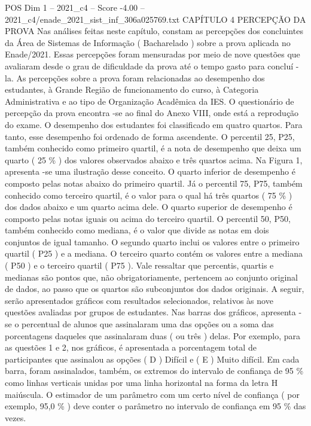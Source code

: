 \begin{textsample}{POS Dim 1 – 2021\_c4 – Score -4.00 – 2021\_c4/enade\_2021\_sist\_inf\_306a025769.txt}  \label{ex:f1_pos_372}
CAPÍTULO 4 PERCEPÇÃO DA PROVA Nas análises feitas neste capítulo, constam as percepções dos concluintes da Área de Sistemas de Informação ( Bacharelado ) sobre a prova aplicada no Enade/2021.
Essas percepções foram mensuradas por meio de nove questões que avaliaram desde o grau de dificuldade da prova até o tempo gasto para concluí -la.
As percepções sobre a prova foram relacionadas ao desempenho dos estudantes, à Grande Região de funcionamento do curso, à Categoria Administrativa e ao tipo de Organização Acadêmica da IES.
O questionário de percepção da prova encontra -se ao final do Anexo VIII, onde está a reprodução do exame.
O desempenho dos estudantes foi classificado em quatro quartos.
Para tanto, esse desempenho foi ordenado de forma ascendente.
O percentil 25, P25, também conhecido como primeiro quartil, é a nota de desempenho que deixa um quarto ( 25 \% ) dos valores observados abaixo e três quartos acima.
Na Figura 1, apresenta -se uma ilustração desse conceito.
O quarto inferior de desempenho é composto pelas notas abaixo do primeiro quartil.
Já o percentil 75, P75, também conhecido como terceiro quartil, é o valor para o qual há três quartos ( 75 \% ) dos dados abaixo e um quarto acima dele.
O quarto superior de desempenho é composto pelas notas iguais ou acima do terceiro quartil.
O percentil 50, P50, também conhecido como mediana, é o valor que divide as notas em dois conjuntos de igual tamanho.
O segundo quarto inclui os valores entre o primeiro quartil ( P25 ) e a mediana.
O terceiro quarto contém os valores entre a mediana ( P50 ) e o terceiro quartil ( P75 ).
Vale ressaltar que percentis, quartis e medianas são pontos que, não obrigatoriamente, pertencem ao conjunto original de dados, ao passo que os quartos são subconjuntos dos dados originais.
A seguir, serão apresentados gráficos com resultados selecionados, relativos às nove questões avaliadas por grupos de estudantes.
Nas barras dos gráficos, apresenta -se o percentual de alunos que assinalaram uma das opções ou a soma das porcentagens daqueles que assinalaram duas ( ou três ) delas.
Por exemplo, para as questões 1 e 2, nos gráficos, é apresentada a porcentagem total de participantes que assinalou as opções ( D ) Difícil e ( E ) Muito difícil.
Em cada barra, foram assinalados, também, os extremos do intervalo de confiança de 95 \% como linhas verticais unidas por uma linha horizontal na forma da letra H maiúscula.
O estimador de um parâmetro com um certo nível de confiança ( por exemplo, 95,0 \% ) deve conter o parâmetro no intervalo de confiança em 95 \% das vezes.

\end{textsample}
